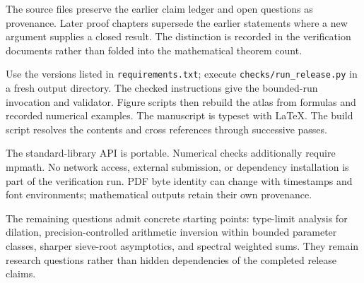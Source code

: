 The source files preserve the earlier claim ledger and open questions as provenance. Later proof chapters supersede the earlier statements where a new argument supplies a closed result. The distinction is recorded in the verification documents rather than folded into the mathematical theorem count.

Use the versions listed in \texttt{requirements.txt}; execute
\texttt{checks/run\_release.py} in a fresh output directory. The checked
instructions give the bounded-run invocation and validator. Figure scripts
then rebuild the atlas from formulas and recorded numerical examples.
The manuscript is typeset with LaTeX. The build script resolves the contents and cross references through successive passes.

The standard-library API is portable. Numerical checks additionally require
mpmath. No network access, external submission, or dependency installation is
part of the verification run. PDF byte identity can change with timestamps
and font environments; mathematical outputs retain their own provenance.

The remaining questions admit concrete starting points: type-limit analysis
for dilation, precision-controlled arithmetic inversion within bounded
parameter classes, sharper sieve-root asymptotics, and spectral weighted sums.
They remain research questions rather than hidden dependencies of the
completed release claims.
